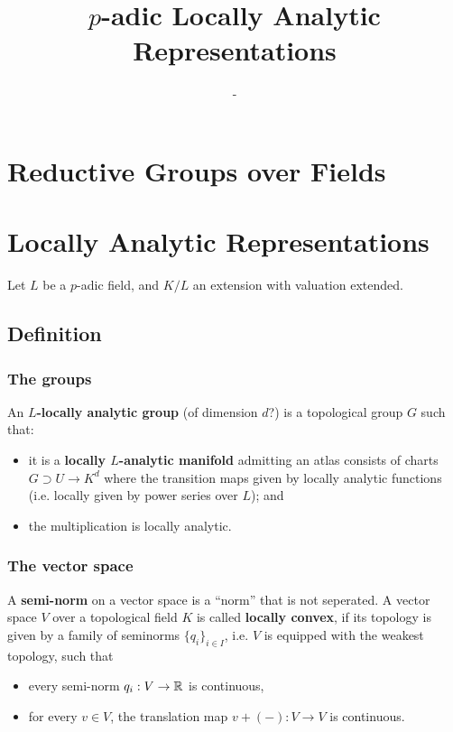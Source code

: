 \documentclass{article}
\title{$p$-adic Locally Analytic Representations}
\author{-}
\begin{document}
\maketitle


\section{Reductive Groups over Fields}

\section{Locally Analytic Representations}
Let $L$ be a $p$-adic field, and $K/L$ an extension with valuation extended.

\subsection{Definition}
\subsubsection{The groups}
An $L$\textbf{-locally analytic group} (of dimension $d$?) is a topological group $G$ such that:\begin{itemize}
    \item it is a \textbf{locally $L$-analytic manifold} admitting an atlas consists of charts
    $G\supset U\to K^d$ where the transition maps given by locally analytic functions (i.e. locally given by power series over $L$); and
    \item the multiplication is locally analytic.
\end{itemize}

\subsubsection{The vector space}
A \textbf{semi-norm} on a vector space is a ``norm'' that is not seperated.
A vector space $V$ over a topological field $K$ is called \textbf{locally convex},
if its topology is given by a family of seminorms $\{q_i\}_{i\in I}$, i.e. $V$ is equipped with the weakest topology,
such that \begin{itemize}
\item every semi-norm $q_i : V\to\mathbb{R}$ is continuous,
\item for every $v\in V$, the translation map $v + (-) : V\to V$ is continuous.
\end{itemize}
\end{document}
